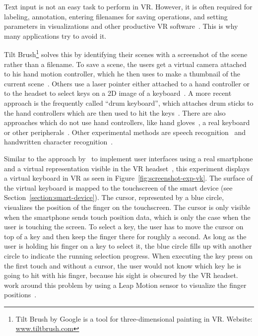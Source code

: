 Text input is not an easy task to perform in \ac{VR}. However, it is often required for labeling, annotation, entering filenames for saving operations, and setting parameters in visualizations and other productive \ac{VR} software~\cite[2154]{Rhoton.2002}. This is why many applications try to avoid it. 

Tilt Brush\footnote{Tilt Brush by Google is a tool for three-dimensional painting in VR. Website: \href{https://www.tiltbrush.com/}{www.tiltbrush.com}} solves this by identifying their scenes with a screenshot of the scene rather than a filename. To save a scene, the users get a virtual camera attached to his hand motion controller, which he then uses to make a thumbnail of the current scene~\cite{GoogleLLC.2019}. %
Others use a laser pointer either attached to a hand controller or to the headset to select keys on a \ac{2D} image of a keyboard~\cite{WeelcoInc.2017}. A more recent approach is the frequently called \enquote{drum keyboard}, which attaches drum sticks to the hand controllers which are then used to hit the keys~\cite{Weisel.2017}. 
There are also approaches which do not use hand controllers, like hand gloves~\cite{Evans.1999,Rhoton.2002}, a real keyboard~\cite{McGill.2015,Walker.2017} or other peripherals~\cite[111\psq]{Gonzalez.2009}. Other experimental methods are speech recognition~\cite[2154\psqq]{Rhoton.2002} and handwritten character recognition~\cite[113]{Gonzalez.2009}.

Similar to the approach by~\citeauthor{Dias.2018} to implement user interfaces using a real smartphone and a virtual representation visible in the \ac{VR} headset~\cite[5]{Dias.2018}, this experiment displays a virtual keyboard in \ac{VR} as seen in Figure~\ref{fig:screenshot-exp-vk}. 
The surface of the virtual keyboard is mapped to the touchscreen of the smart device (see Section~\ref{section:smart-device}). The cursor, represented by a blue circle, visualizes the position of the finger on the touchscreen. The cursor is only visible when the smartphone sends touch position data, which is only the case when the user is touching the screen. To select a key, the user has to move the cursor on top of a key and then keep the finger there for roughly a second. As long as the user is holding his finger on a key to select it, the blue circle fills up with another circle to indicate the running selection progress. When executing the key press on the first touch and without a cursor, the user would not know which key he is going to hit with his finger, because his sight is obscured by the \ac{VR} headset. \citeauthor{Dias.2018} work around this problem by using a Leap Motion sensor to visualize the finger positions~\cite[4]{Dias.2018}.

